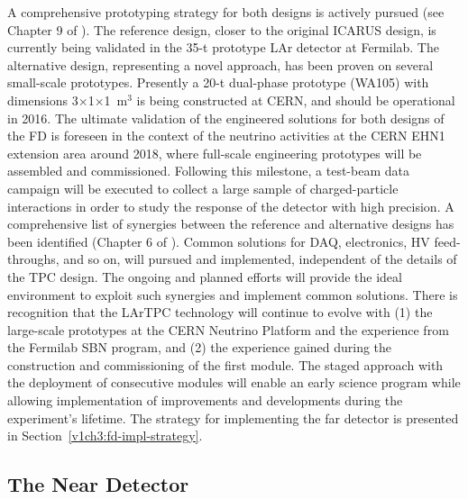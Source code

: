 A  comprehensive prototyping strategy for both designs is actively pursued (see Chapter 9 of \voldune).
The reference design, closer to the original ICARUS design, is currently being validated in the 35-t prototype 
LAr detector at Fermilab.  The alternative design, representing a novel approach, has been proven on several
small-scale prototypes. Presently
a 20-t dual-phase prototype (WA105) with dimensions 3$\times$1$\times$1~m$^3$ is being constructed at CERN,  
and should be operational in 2016. 
The ultimate validation of the engineered solutions for both designs of the FD is foreseen in
the context of the neutrino activities at the CERN EHN1 extension area around 2018, 
where full-scale engineering prototypes will be 
assembled and commissioned. Following this milestone, a test-beam data 
campaign will be executed %
to collect a large sample of charged-particle interactions
in order to study the response of the detector with high precision.
A comprehensive list of synergies between the reference and alternative designs has been identified (Chapter 6 of \voldune). Common solutions for DAQ, electronics, HV feed-throughs, and so on, will pursued and implemented, independent of the details of the TPC design. The ongoing and planned efforts %
will
provide the ideal environment to exploit such synergies and implement common solutions.
There is recognition that the LArTPC technology will continue to evolve with (1) the large-scale prototypes at the CERN Neutrino Platform and the experience from the Fermilab SBN program, and (2) the experience gained during the construction and commissioning of the first  module. 
The staged approach with the deployment of consecutive modules will
enable an early science program while allowing implementation of improvements and developments  during the experiment's lifetime.
The strategy for implementing
the far detector is presented in Section~\ref{v1ch3:fd-impl-strategy}.

\subsection{The Near Detector} %

